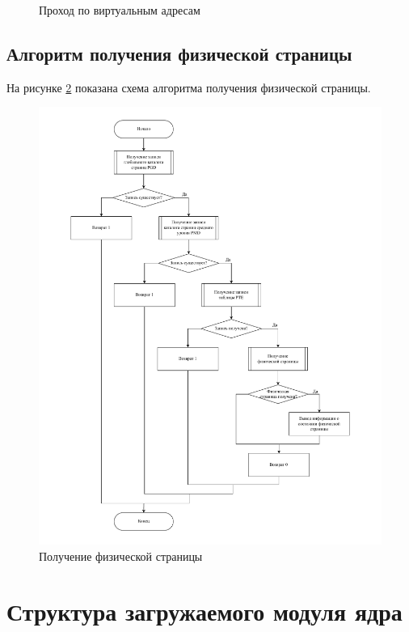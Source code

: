\begin{figure}[H]
\begin{center}
	\end{center}
	\captionsetup{justification=centering}
	\caption{Проход по виртуальным адресам}
	\label{img:trace_pages}
\end{figure}

\subsection{Алгоритм получения физической страницы}

На рисунке \ref{img:get-page} показана схема алгоритма получения физической страницы.

\begin{figure}[H]
	\begin{center}
		\includegraphics[scale=0.55]{inc/img/get_page.pdf}
	\end{center}
	\captionsetup{justification=centering}
	\caption{Получение физической страницы}
	\label{img:get-page}
\end{figure}

\section{Структура загружаемого модуля ядра}

